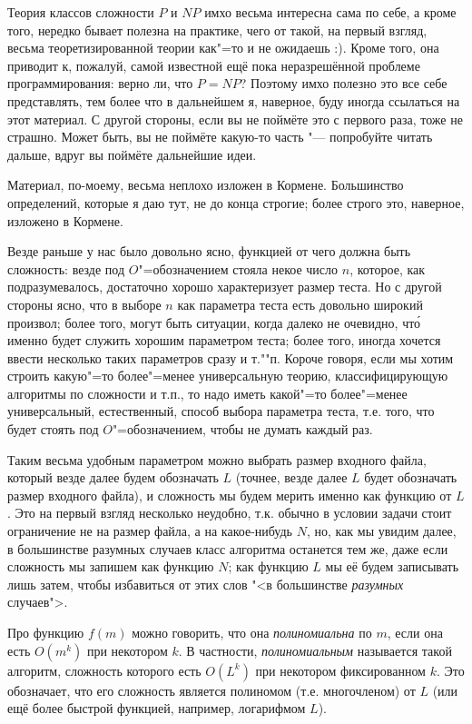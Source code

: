 \documentclass[a4paper,10pt]{problems}
\begin{document}

Теория классов сложности $P$ и $NP$ имхо весьма интересна сама по себе, а кроме 
того, нередко бывает полезна на практике, чего от такой, на первый взгляд, 
весьма теоретизированной теории как"=то и не ожидаешь :). Кроме того, она 
приводит к, пожалуй, самой известной ещё пока неразрешённой проблеме 
программирования: верно ли, что $P=NP$? Поэтому имхо полезно это все 
себе представлять, тем более что в дальнейшем я, наверное, буду иногда ссылаться на 
этот материал. С другой стороны, если вы не поймёте это с первого раза, тоже не 
страшно. Может быть, вы не поймёте какую-то часть "--- попробуйте читать 
дальше, вдруг вы поймёте дальнейшие идеи.

Материал, по-моему, весьма неплохо изложен в Кормене. Большинство определений, 
которые я даю тут, не до конца строгие; более строго это, наверное, изложено в 
Кормене.

 Везде раньше у нас было довольно ясно, 
функцией от чего должна быть сложность: везде под $O$"=обозначением стояла 
некое число $n$, которое, как подразумевалось, достаточно хорошо характеризует 
размер теста. Но с другой стороны ясно, что в выборе $n$ как параметра теста 
есть довольно широкий произвол; более того, могут быть ситуации, когда далеко 
не очевидно, чт\'{о} именно будет служить хорошим параметром теста; более того, 
иногда хочется ввести несколько таких параметров сразу и т.""п. Короче говоря, 
если мы хотим строить какую"=то более"=менее универсальную теорию, 
классифицирующую алгоритмы по сложности и т.п., то надо иметь какой"=то 
более"=менее универсальный, естественный, способ выбора параметра теста, т.е. 
того, что будет стоять под $O$"=обозначением, чтобы не думать каждый раз.

Таким весьма удобным параметром можно выбрать размер входного файла, который 
везде далее будем обозначать $L$ (точнее, везде далее $L$ будет обозначать 
размер входного файла), и сложность мы будем мерить именно как функцию от $L$. 
Это на первый взгляд несколько неудобно, т.к. обычно в условии задачи стоит 
ограничение не на размер файла, а на какое-нибудь $N$, но, как мы увидим далее, 
в большинстве разумных случаев класс алгоритма останется тем же, даже если 
сложность мы запишем как функцию $N$; как функцию $L$ мы её будем записывать 
лишь затем, чтобы избавиться от этих слов "<в большинстве \textit{разумных} 
случаев">.

 Про функцию 
$f(m)$ можно говорить, что она \textit{полиномиальна} по $m$, если она есть 
$O(m^k)$ при некотором $k$. В частности,
\textit{полиномиальным} называется такой алгоритм, сложность которого есть 
$O(L^k)$ при некотором фиксированном $k$. Это обозначает, что его сложность 
является полиномом (т.е. многочленом) от $L$ (или ещё более быстрой функцией, 
например, логарифмом $L$).
\end{document}

